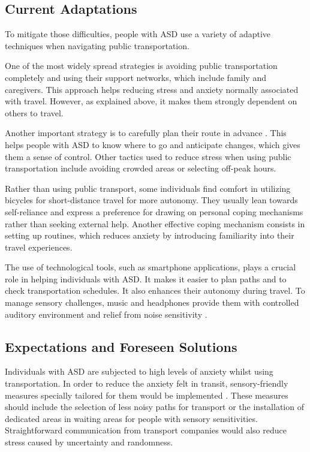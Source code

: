 \subsection{Current Adaptations}

To mitigate those difficulties, people with ASD use a variety of adaptive techniques when navigating public transportation. 

One of the most widely spread strategies is avoiding public transportation completely and using their support networks, which include family and caregivers\cite{2015DetourRightPlace}. This approach helps reducing stress and anxiety normally associated with travel. However, as explained above, it makes them strongly dependent on others to travel. 

Another important strategy is to carefully plan their route in advance \cite{2020ExperiencesYoungAutistic}. This helps people with ASD to know where to go and anticipate changes, which gives them a sense of control. Other tactics used to reduce stress when using public transportation include avoiding crowded areas or selecting off-peak hours.

Rather than using public transport, some individuals find comfort in utilizing bicycles for short-distance travel \cite{2015ViewpointsAdultsAutism} for more autonomy. They usually lean towards self-reliance and express a preference for drawing on personal coping mechanisms rather than seeking external help. Another effective coping mechanism consists in setting up routines\cite{2015ViewpointsAdultsAutism}, which reduces anxiety by introducing familiarity into their travel experiences. 

The use of technological tools, such as smartphone applications, plays a crucial role in helping individuals with ASD. It makes it easier to plan paths and to check transportation schedules. It also enhances their autonomy during travel. To manage sensory challenges, music and headphones provide them with controlled auditory environment and relief from noise sensitivity \cite{2020ExperiencesYoungAutistic}. 

\subsection{Expectations and Foreseen Solutions}

Individuals with ASD are subjected to high levels of anxiety whilst using transportation. In order to reduce the anxiety felt in transit, sensory-friendly measures specially tailored for them would be implemented \cite{2020ExperiencesYoungAutistic}. These measures should include the selection of less noisy paths for transport or the installation of dedicated areas in waiting areas for people with sensory sensitivities. Straightforward communication from transport companies would also reduce stress caused by uncertainty and randomness.

